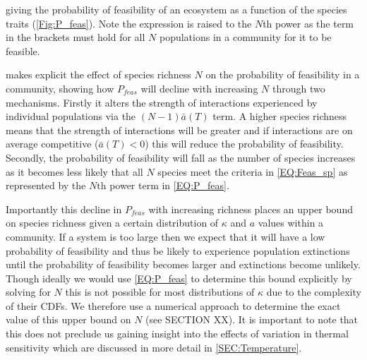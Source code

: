 \documentclass{article}
\begin{document}
giving the probability of feasibility of an ecosystem as a function of the species traits (\cref{Fig:P_feas}). Note the expression is raised to the $N$th power as the term in the brackets must hold for all $N$ populations in a community for it to be feasible.

 makes explicit the effect of species richness $N$ on the probability of feasibility in a community, showing how $P_{feas}$ will decline with increasing $N$ through two mechanisms. Firstly it alters the strength of interactions experienced by individual populations via the $(N-1) \bar{a}(T)$ term. A higher species richness means that the strength of interactions will be greater and if interactions are on average competitive ($\bar{a}(T) < 0$) this will reduce the probability of feasibility. Secondly, the probability of feasibility will fall as the number of species increases as it becomes less likely that all $N$ species meet the criteria in \cref{EQ:Feas_sp} as represented by the $N\text{th}$ power term in \cref{EQ:P_feas}. 

Importantly this decline in $P_{feas}$ with increasing richness places an upper bound on species richness given a certain distribution of $\kappa$ and $a$ values within a community. If a system is too large then we expect that it will have a low probability of feasibility and thus be likely to experience population extinctions until the probability of feasibility becomes larger and extinctions become unlikely. Though ideally we would use \cref{EQ:P_feas} to determine this bound explicitly by solving for $N$ this is not possible for most distributions of $\kappa$ due to the complexity of their CDFs. We therefore use a numerical approach to determine the exact value of this upper bound on $N$ (see SECTION XX). It is important to note that this does not preclude us gaining insight into the effects of variation in thermal sensitivity which are discussed in more detail in \cref{SEC:Temperature}. 
\end{document}
